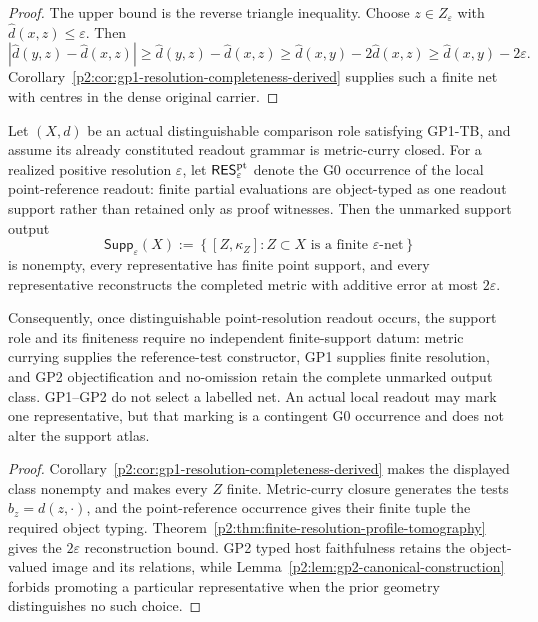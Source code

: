 \documentclass[11pt,a4paper]{article}
\begin{document}
\begin{proof}
The upper bound is the reverse triangle inequality.  Choose
\(z\in Z_\varepsilon\) with \(\widehat d(x,z)\leq\varepsilon\).  Then
\[
 |\widehat d(y,z)-\widehat d(x,z)|
 \geq \widehat d(y,z)-\widehat d(x,z)
 \geq \widehat d(x,y)-2\widehat d(x,z)
 \geq \widehat d(x,y)-2\varepsilon.
\]
Corollary~\ref{p2:cor:gp1-resolution-completeness-derived} supplies such a
finite net with centres in the dense original carrier.
\end{proof}

\begin{theorem}
\label{p2:thm:derived-finite-point-support-role}
Let \((X,d)\) be an actual distinguishable comparison role satisfying GP1-TB,
and assume its already constituted readout grammar is metric-curry closed.
For a realized positive resolution \(\varepsilon\), let
\(\mathsf{RES}^{\rm pt}_\varepsilon\) denote the G0 occurrence of the local
point-reference readout: finite partial evaluations are object-typed as one
readout support rather than retained only as proof witnesses.  Then the
unmarked support output
\[
 \mathsf{Supp}_\varepsilon(X)
 :=
 \left\{
 [Z,\kappa_Z]:
 Z\subset X\text{ is a finite }\varepsilon\text{-net}
 \right\}
\]
is nonempty, every representative has finite point support, and every
representative reconstructs the completed metric with additive error at most
\(2\varepsilon\).

Consequently, once distinguishable point-resolution readout occurs, the
support role and its finiteness require no independent finite-support datum:
metric currying supplies the reference-test constructor, GP1 supplies finite
resolution, and GP2 objectification and no-omission retain the complete
unmarked output class.  GP1--GP2 do not select a labelled net.  An actual
local readout may mark one representative, but that marking is a contingent
G0 occurrence and does not alter the support atlas.
\end{theorem}

\begin{proof}
Corollary~\ref{p2:cor:gp1-resolution-completeness-derived} makes the displayed
class nonempty and makes every \(Z\) finite.  Metric-curry closure generates
the tests \(b_z=d(z,\cdot)\), and the point-reference occurrence gives their
finite tuple the required object typing.  Theorem~\ref{p2:thm:finite-resolution-profile-tomography}
gives the \(2\varepsilon\) reconstruction bound.  GP2 typed host faithfulness
retains the object-valued image and its relations, while
Lemma~\ref{p2:lem:gp2-canonical-construction} forbids promoting a particular
representative when the prior geometry distinguishes no such choice.
\end{proof}
\end{document}
